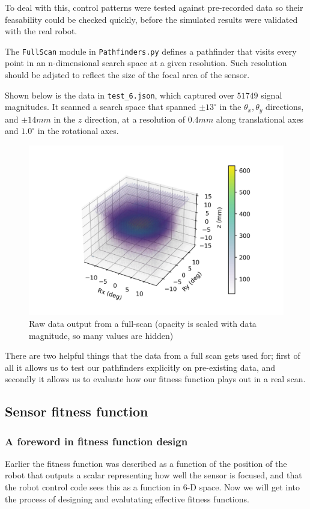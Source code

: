 \documentclass[11pt]{article}
\begin{document}
To deal with this, control patterns were tested against pre-recorded data so their feasability could be checked quickly, before the simulated results were validated with the real robot.

The \texttt{FullScan} module in \texttt{Pathfinders.py} defines a pathfinder that visits every point in an n-dimensional search space at a given resolution. Such resolution should be adjsted to reflect the size of the focal area of the sensor.

Shown below is the data in \texttt{test\_6.json}, which captured over $51749$ signal magnitudes. It scanned a search space that spanned $\pm 13^\circ$ in the $\theta_x,\theta_y$ directions, and $\pm 14 mm$ in the $z$ direction, at a resolution of $0.4 mm$ along translational axes and $1.0^\circ$ in the rotational axes.

\begin{figure}
    \includegraphics[width=.9\linewidth]{figures/fullscan_render_test_6.jpg}
    \caption{Raw data output from a full-scan (opacity is scaled with data magnitude, so many values are hidden)}
\end{figure}

There are two helpful things that the data from a full scan gets used for; first of all it allows us to test our pathfinders explicitly on pre-existing data, and secondly it allows us to evaluate how our fitness function plays out in a real scan.

\subsection{Sensor fitness function}
\subsubsection{A foreword in fitness function design}
Earlier the fitness function was described as a function of the position of the robot that outputs a scalar representing how well the sensor is focused, and that the robot control code sees this as a function in 6-D space. Now we will get into the process of designing and evalutating effective fitness functions.
\end{document}

